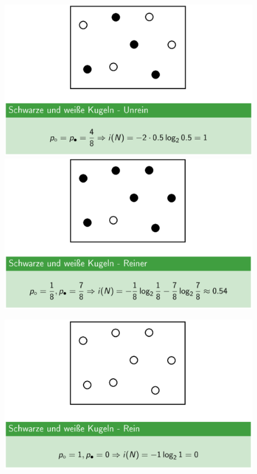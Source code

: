\documentclass{report}
\begin{document}
  \begin{figure}[H]	
    \centering	
    \begin{minipage}[b]{0.4\textwidth}	
      \includegraphics[scale=.2]{ml07_3}	
    \end{minipage}	
    \begin{minipage}[b]{0.4\textwidth}	
      \includegraphics[scale=.2]{ml07_4}	
    \end{minipage}	
  \end{figure}	
  
  \begin{figure}[H]	
    \centering	
    \begin{minipage}[b]{0.4\textwidth}	
      \includegraphics[scale=.2]{ml07_5}	
    \end{minipage}	
  \end{figure}	
  
\end{document}
